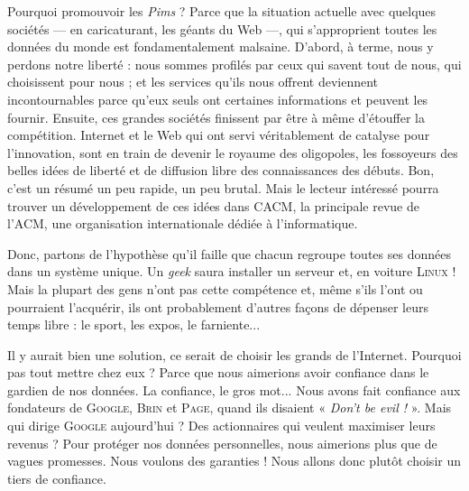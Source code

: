 Pourquoi promouvoir les \textit{Pims} ? Parce que la situation actuelle avec quelques sociétés --- en caricaturant, les géants du Web ---, qui s’approprient toutes les données du monde est fondamentalement malsaine. D’abord, à terme, nous y perdons notre liberté : nous sommes profilés par ceux qui savent tout de nous, qui choisissent pour nous ; et les services qu’ils nous offrent deviennent incontournables parce qu'eux seuls ont certaines informations et peuvent les fournir. Ensuite, ces grandes sociétés finissent par être à même d’étouffer la compétition. Internet et le Web qui ont servi véritablement de catalyse pour l’innovation, sont en train de devenir le royaume des oligopoles, les fossoyeurs des belles idées de liberté et de diffusion libre des connaissances des débuts. Bon, c’est un résumé un peu rapide, un peu brutal. Mais le lecteur intéressé pourra trouver un développement de ces idées \parencite{Abiteboul-et-al:2015} dans CACM, la principale revue de l’ACM, une organisation internationale dédiée à l’informatique.

Donc, partons de l’hypothèse qu’il faille que chacun regroupe toutes ses données dans un système unique. Un \textit{geek} saura installer un serveur et, en voiture \textsc{Linux} ! Mais la plupart des gens n’ont pas cette compétence et, même s’ils l’ont ou pourraient l’acquérir, ils ont probablement d’autres façons de dépenser leurs temps libre : le sport, les expos, le farniente...

Il y aurait bien une solution, ce serait de choisir les grands de l’Internet. Pourquoi pas tout mettre chez eux ? Parce que nous aimerions avoir confiance dans le gardien de nos données. La confiance, le gros mot... Nous avons fait confiance aux fondateurs de \textsc{Google}, \textsc{Brin} et \textsc{Page}, quand ils disaient « \textit{Don’t be evil !} ». Mais qui dirige \textsc{Google} aujourd’hui ? Des actionnaires qui veulent maximiser leurs revenus ? Pour protéger nos données personnelles, nous aimerions plus que de vagues promesses. Nous voulons des garanties ! Nous allons donc plutôt choisir un tiers de confiance.

